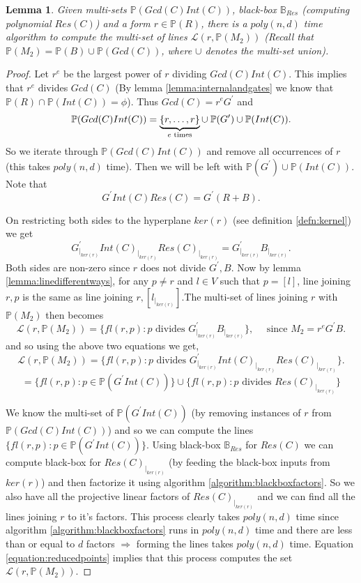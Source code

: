 \documentclass[12pt]{caltech_thesis}
\theoremstyle{plain}
\newtheorem{lemma}{Lemma}
\theoremstyle{definition}
\newcommand{\ML}{\mathcal{L}}
\newcommand{\CB}{\mathbb{B}}
\newcommand{\PP}{\mathbb{P}}
\begin{document}
  
 \begin{lemma}
  Given multi-sets $\PP(Gcd(C)Int(C))$, black-box $\CB_{Res}$ (computing polynomial $Res(C)$) and a form $r\in \PP(R)$, there is a $poly(n,d)$ time algorithm to compute
  the multi-set of lines $\ML(r,\PP(M_2))$ (Recall that $\PP(M_2) = \PP(B)\cup \PP(Gcd(C))$, where $\cup$ denotes the multi-set union).
 \end{lemma}
 \begin{proof}
  Let $r^e$ be the largest power of $r$ dividing $Gcd(C)Int(C)$. This implies
  that $r^e$ divides $Gcd(C)$ (By lemma \ref{lemma:internalandgates} we know that $\PP(R)\cap \PP(Int(C))=\phi$). Thus $Gcd(C) =r^e G^\prime$ and
  \[\PP(Gcd(C)Int(C)) = \underbrace{\{r,\ldots,r\}}_{\text{ $e$ times }} \cup \hspace{0.25em} \PP(G^\prime)\cup \PP(Int(C)).\]
So we iterate through $\PP(Gcd(C)Int(C))$ and remove all occurrences of $r$ (this takes $poly(n,d)$ time). Then we will be left with
$\PP(G^\prime)\cup \PP(Int(C))$. Note that
\[
 G^\prime Int(C)Res(C) = G^\prime (R+B).
\]


On restricting both sides to the hyperplane $ker(r)$ (see definition \ref{defn:kernel}) we get
\begin{equation}
 G^\prime_{|_{ker(r)}}Int(C)_{|_{ker(r)}}Res(C)_{|_{ker(r)}} = G^\prime_{|_{ker(r)}}B_{|_{ker(r)}}.
\end{equation}
Both sides are non-zero since $r$ does not divide $G^\prime,B$. Now by lemma \ref{lemma:linedifferentways}, for any $p\neq r$ and $l\in V$ such that
$p=[l]$, line joining
$r,p$ is the same as line joining $r,[l_{|_{ker(r)}}]$.The multi-set of lines
joining $r$ with $\PP(M_2)$ then becomes
\begin{equation}
 \ML(r,\PP(M_2)) = \{fl(r,p) : p \text{ divides }G^\prime_{|_{ker(r)}}B_{|_{ker(r)}}\}, \hspace{1em} \text{ since } 
 M_2 = r^eG^\prime B.
\end{equation}
and so using the above two equations we get,
\begin{equation}\label{equation:reducedpoints}
 \ML(r,\PP(M_2)) = \{fl(r,p) : p \text{ divides }G^\prime_{|_{ker(r)}} Int(C)_{|_{ker(r)}} Res(C)_{|_{ker(r)}}\}.
\end{equation}
\[
 =\{fl(r,p) : p \in \PP(G^\prime Int(C))\} \cup \{fl(r,p) : p \text{ divides } Res(C)_{|_{ker(r)}}\}
\]

We know the multi-set of $\PP(G^\prime Int(C))$ (by removing instances of $r$ from $\PP(Gcd(C)Int(C))$) and so we can compute the lines
$\{fl(r,p) : p \in \PP(G^\prime Int(C))\}$. Using 
black-box $\CB_{Res}$ for $Res(C)$ we can compute black-box for $Res(C)_{|_{ker(r)}}$ (by feeding the black-box inputs from $ker(r)$) and then
factorize it using algorithm \ref{algorithm:blackboxfactors}. So we also have all the projective linear factors of $Res(C)_{|_{ker(r)}}$
and we can find all the lines joining $r$ to it's factors. This process clearly takes $poly(n,d)$ time since 
algorithm \ref{algorithm:blackboxfactors} runs in $poly(n,d)$ time and there are less than or equal to $d$ factors $\Rightarrow$ forming 
the lines takes $poly(n,d)$ time. 
Equation \ref{equation:reducedpoints} implies
that this process computes the set $\ML(r,\PP(M_2))$.
  \end{proof}
\end{document}
